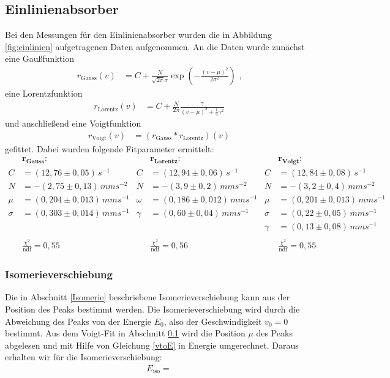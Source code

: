 \subsection{Einlinienabsorber}\label{einlinien}
Bei den Messungen für den Einlinienabsorber wurden die in Abbildung \ref{fig:einlinien} aufgetragenen Daten aufgenommen. An die Daten wurde zunächst eine Gaußfunktion
\begin{align}
	r_\mathrm{Gauss}(v)&=C+\frac{N}{\sqrt{2\pi}\sigma}\exp(-\frac{(v-\mu)^2}{2\sigma^2})\text{ ,}
\end{align}
eine Lorentzfunktion 
\begin{align}
	r_\mathrm{Lorentz}(v)&=C+\frac{N}{2\pi}\frac{\gamma}{\left(v-\mu\right)^2+\frac14\gamma^2}
\end{align}
und anschließend eine Voigtfunktion 
\begin{align}
	r_\mathrm{Voigt}(v)&=\left(r_\mathrm{Gauss}*r_\mathrm{Lorentz}\right)(v)
\end{align}
gefittet. Dabei wurden folgende Fitparameter ermittelt:
\begin{align*}
	&\mathbf{r_\textbf{Gauss}}\textbf{:}&&\mathbf{r_\textbf{Lorentz}}\textbf{:}&&\mathbf{r_\textbf{Voigt}}\textbf{:}\\
	C&=(12,76\pm0,05)\,\si{s^{-1}}&C&=(12,94\pm0,06)\,\si{s^{-1}}&C&=(12,84\pm0,08)\,\si{s^{-1}}
	\\N&=-(2,75\pm0,13)\,\si{mms^{-2}}&N&=-(3,9\pm0,2)\,\si{mms^{-2}}&N&=-(3,2\pm0,4)\,\si{mms^{-2}}
	\\\mu&=(0,204\pm0,013)\,\si{mms^{-1}}&\omega&=(0,186\pm0,012)\,\si{mms^{-1}}&\mu&=(0,201\pm0,013)\,\si{mms^{-1}}
	\\\sigma&=(0,303\pm0,014)\,\si{mms^{-1}}&\gamma&=(0,60\pm0,04)\,\si{mms^{-1}}&\sigma&=(0,22\pm0,05)\,\si{mms^{-1}}
	\\&&&&\gamma&=(0,13\pm0,08)\,\si{mms^{-1}}\\\ 
	\\&\frac{\chi^2}{\mathrm{ndf}}=0,55&&\frac{\chi^2}{\mathrm{ndf}}=0,56&&\frac{\chi^2}{\mathrm{ndf}}=0,55
\end{align*}

\subsubsection{Isomerieverschiebung}
Die in Abschnitt \ref{Isomerie} beschriebene Isomerieverschiebung kann aus der Position des Peaks bestimmt werden. Die Isomerieverschiebung wird durch die Abweichung des Peaks von der Energie $E_0$, also der Geschwindigkeit $v_0=0$ bestimmt. Aus dem Voigt-Fit in Abschnitt \ref{einlinien} wird die Position $\mu$ des Peaks abgelesen und mit Hilfe von Gleichung \ref{vtoE} in Energie umgerechnet. Daraus erhalten wir für die Isomerieverschiebung:
\begin{align}
	E_\mathrm{iso}=
\end{align}
